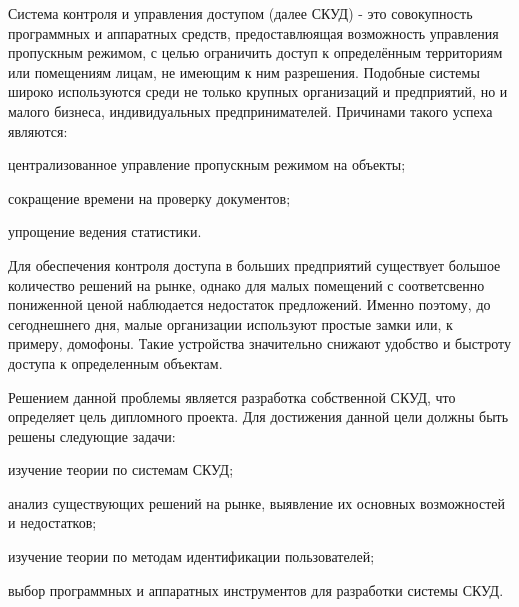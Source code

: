 
Система контроля и управления доступом (далее СКУД) - это совокупность
программных и аппаратных средств, предоставлюящая возможность управления пропускным режимом, с целью ограничить доступ к определённым территориям или помещениям лицам, не имеющим к ним разрешения. Подобные системы широко используются среди не только крупных организаций и предприятий, но и малого бизнеса, индивидуальных предпринимателей. Причинами такого успеха являются:

\begin{itemize*}
\item централизованное управление пропускным режимом на объекты;
\item сокращение времени на проверку документов;
\item упрощение ведения статистики.
\end{itemize*}

Для обеспечения контроля доступа в больших предприятий существует большое количество решений на рынке, однако для малых помещений с соответсвенно пониженной ценой наблюдается недостаток предложений. Именно поэтому, до сегоднешнего дня, малые организации используют простые замки или, к примеру, домофоны. Такие устройства значительно снижают удобство и быстроту доступа к определенным объектам. 

Решением данной проблемы является разработка собственной СКУД, что определяет цель дипломного проекта. Для достижения данной цели должны быть решены следующие задачи:

\begin{itemize*}
\item изучение теории по системам СКУД;
\item анализ существующих решений на рынке, выявление их основных возможностей и недостатков;
\item изучение теории по методам идентификации пользователей;
\item выбор программных и аппаратных инструментов для разработки системы СКУД.
\end{itemize*}

